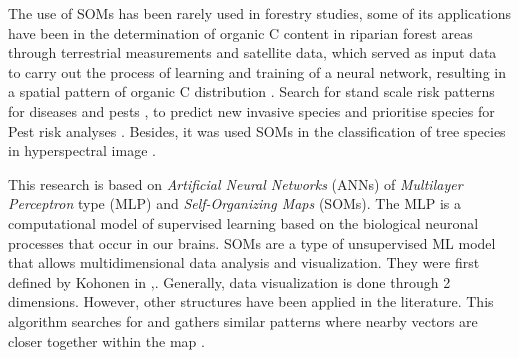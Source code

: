 \documentclass[conference]{IEEEtran}
\begin{document}
The use of SOMs has been rarely used in forestry studies, some of its applications have been in the determination of organic C content in riparian forest areas through terrestrial measurements and satellite data, which served as input data to carry out the process of learning and training of a neural network, resulting in a spatial pattern of organic C distribution \cite{suchenwirth2014large}. Search for stand scale risk patterns for diseases and pests \cite{park2013hazard}, to predict new invasive species and prioritise species for Pest risk analyses \cite{eschen2014likelihood}. Besides, it was used SOMs in the classification of tree species in hyperspectral image \cite{malathy2016classification}.

This research is based on \textit{Artificial Neural Networks} (ANNs) of \textit{Multilayer Perceptron} type (MLP) and \textit{Self-Organizing Maps} (SOMs). The MLP is a computational model of supervised learning based on the biological neuronal processes that occur in our brains. SOMs are a type of unsupervised ML model that allows multidimensional data analysis and visualization. They were first defined by Kohonen in \cite{kohonen1982self},\cite{kohonen19822}. Generally, data visualization is done through 2 dimensions. However, other structures have been applied in the literature. This algorithm searches for and gathers similar patterns where nearby vectors are closer together within the map \cite{kohonen1995springer}.
\end{document}
